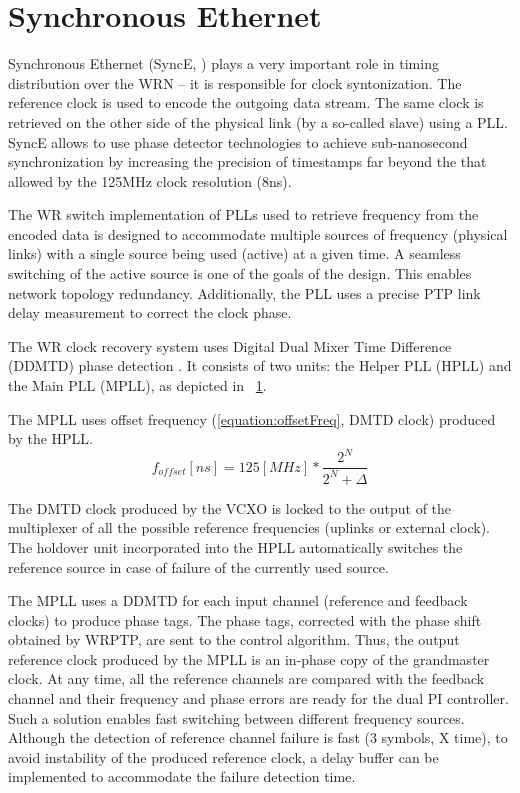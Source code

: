 \section{Synchronous Ethernet}


Synchronous Ethernet (SyncE, \cite{biblio:SynchE}) plays a very
important role in timing distribution over the WRN -- it is
responsible for clock syntonization. The reference clock is used to
encode the outgoing data stream.  The same clock is retrieved on the
other side of the physical link (by a so-called slave) using a
PLL. SyncE allows to use phase detector technologies to achieve
sub-nanosecond synchronization by increasing the precision of
timestamps far beyond the that allowed by the 125MHz clock resolution
(8ns).

The WR switch implementation of PLLs used to retrieve frequency from the
encoded data is designed to accommodate multiple sources of frequency (physical
links) with a single source being used (active) at a given time. A seamless
switching of the active source is one of the goals of the design. This enables
network topology redundancy. Additionally, the PLL uses a precise PTP link delay
measurement to correct the clock phase.

The WR clock recovery system uses Digital Dual Mixer Time Difference
(DDMTD) phase detection \cite{biblio:WRproject}. It consists of two
units: the Helper PLL (HPLL) and the Main PLL (MPLL), as depicted in
\figurename~\ref{}.

The MPLL uses offset frequency (\ref{equation:offsetFreq}, DMTD clock)
produced by the HPLL.
\begin{equation}
  \label{equation:offsetFreq}
     f_{offset}[ns] =  125[MHz] * \frac{2^N}{2^N+ \Delta}
\end{equation}

The DMTD clock produced by the VCXO is locked to the output of the
multiplexer of all the possible reference frequencies (uplinks or
external clock). The holdover unit incorporated into the HPLL
automatically switches the reference source in case of failure of the
currently used source.

The MPLL uses a DDMTD for each input channel (reference and feedback
clocks) to produce phase tags. The phase tags, corrected with the
phase shift obtained by WRPTP, are sent to the control
algorithm. Thus, the output reference clock produced by the MPLL is an
in-phase copy of the grandmaster clock. At any time, all the reference
channels are compared with the feedback channel and their frequency
and phase errors are ready for the dual PI controller. Such a solution
enables fast switching between different frequency sources. Although
the detection of reference channel failure is fast (3 symbols, X
time), to avoid instability of the produced reference clock, a delay
buffer can be implemented to accommodate the failure detection time.
